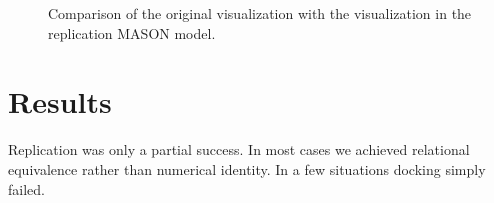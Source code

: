 \documentclass[runningheads,a4paper]{article}
\begin{document}
\begin{figure}
\centering
\caption{Comparison of the original visualization with the visualization in the replication MASON model. }
\label{fig:gui-comparison}
\end{figure}


\section{Results}
Replication was only a partial success. 
In most cases we achieved relational equivalence \cite{springerlink:10.1007/BF01299065} rather than numerical identity.
In a few situations docking simply failed.
\end{document}
